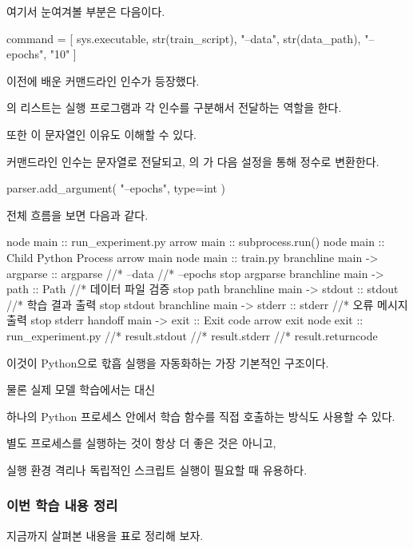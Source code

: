 여기서 눈여겨볼 부분은 다음이다.

\begin{dhkcode}
command = [
    sys.executable,
    str(train_script),
    "--data",
    str(data_path),
    "--epochs",
    "10"
]
\end{dhkcode}

이전에 배운 커맨드라인 인수가 등장했다.

의 리스트는 실행 프로그램과 각 인수를 구분해서 전달하는 역할을 한다.

또한 이 문자열인 이유도 이해할 수 있다.

커맨드라인 인수는 문자열로 전달되고, 의 가 다음 설정을 통해 정수로 변환한다.

\begin{dhkcode}
parser.add_argument(
    "--epochs",
    type=int
)
\end{dhkcode}

전체 흐름을 보면 다음과 같다.

\begin{dhkbranch}[in=8]
node main :: run_experiment.py
arrow main :: subprocess.run()
node main :: Child Python Process
arrow main
node main :: train.py
branchline main -> argparse :: argparse //* --data //* --epochs
stop argparse
branchline main -> path :: Path //* 데이터 파일 검증
stop path
branchline main -> stdout :: stdout //* 학습 결과 출력
stop stdout
branchline main -> stderr :: stderr //* 오류 메시지 출력
stop stderr
handoff main -> exit :: Exit code
arrow exit
node exit :: run_experiment.py //* result.stdout //* result.stderr //* result.returncode
\end{dhkbranch}

이것이 Python으로 핛흡 실행을 자동화하는 가장 기본적인 구조이다.

물론 실제 모델 학습에서는  대신 

하나의 Python 프로세스 안에서 학습 함수를 직접 호출하는 방식도 사용할 수 있다.

별도 프로세스를 실행하는 것이 항상 더 좋은 것은 아니고,

실행 환경 격리나 독립적인 스크립트 실행이 필요할 때 유용하다.

\subsubsection{이번 학습 내용 정리}

지금까지 살펴본 내용을 표로 정리해 보자.

